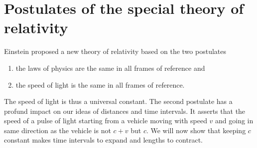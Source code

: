 \section{Postulates of the special theory of relativity}\label{c2s2}
Einstein proposed a new theory of relativity based on the two postulates
\begin{enumerate}
\item the laws of physics are the same in all frames of reference and 
\item the speed of light is the same in all frames of reference.
\end{enumerate}
The speed of light is thus a universal constant. The second postulate has a 
profund impact on our ideas of distances and time intervals. It asserts that
the speed of a pulse of light starting from a vehicle moving with speed $v$
and going in same direction as the vehicle is not $c + v$ but $c$. We will now
show that keeping $c$ constant makes time intervals to expand and lengths to 
contract.

